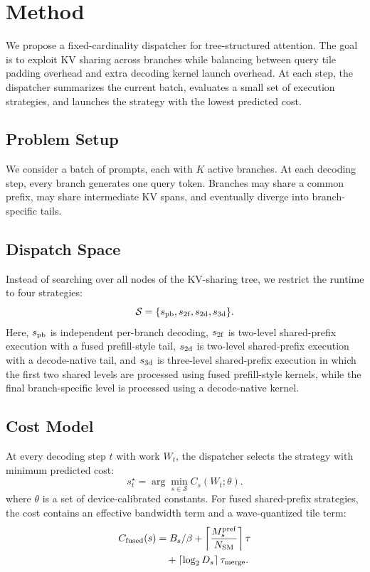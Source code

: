 \documentclass[11pt]{article}
\begin{document}
\section{Method}
\label{sec:method}

We propose a fixed-cardinality dispatcher for tree-structured attention.
The goal is to exploit KV sharing across branches while balancing between query tile padding overhead and extra decoding kernel launch overhead. At each step, the dispatcher summarizes the current batch, evaluates a small set of execution 
strategies, and launches the strategy with the lowest
predicted cost. 

\subsection{Problem Setup}

We consider a batch of prompts, each with $K$ active branches. At each
decoding step, every branch generates one query token. Branches may share a
common prefix, may share intermediate KV spans, and eventually diverge into
branch-specific tails.

\subsection{Dispatch Space}

Instead of searching over all nodes of the KV-sharing tree, we restrict the
runtime to four strategies:
\begin{equation}
\label{eq:strategy-set}
\mathcal{S}
=
\{s_{\rm pb}, s_{\rm 2f}, s_{\rm 2d}, s_{\rm 3d}\}.
\end{equation}
Here, $s_{\rm pb}$ is independent per-branch decoding, $s_{\rm 2f}$ is
two-level shared-prefix execution with a fused prefill-style tail, $s_{\rm 2d}$
is two-level shared-prefix execution with a decode-native tail, and
$s_{\rm 3d}$ is three-level shared-prefix execution in which the first two
shared levels are processed using fused prefill-style kernels, while the final
branch-specific level is processed using a decode-native kernel.

\subsection{Cost Model}

At every decoding step $t$ with work $W_t$, the dispatcher selects the strategy with minimum
predicted cost:
\begin{equation}
\label{eq:picker}
s_t^\star
=
\arg\min_{s\in\mathcal{S}}
C_s(W_t;\theta).
\end{equation}
where $\theta$ is a set of device-calibrated constants.
For fused shared-prefix strategies, the cost contains an effective bandwidth
term and a wave-quantized tile term:
\begin{equation}
\label{eq:fused-cost}
\begin{aligned}
C_{\rm fused}(s)
&=
B_s/\beta
+
\left\lceil
\frac{M_s^{\rm pref}}{N_{\rm SM}}
\right\rceil \tau
\\
&\quad
+
\left\lceil \log_2 D_s \right\rceil \tau_{\rm merge}.
\end{aligned}
\end{equation}
\end{document}
